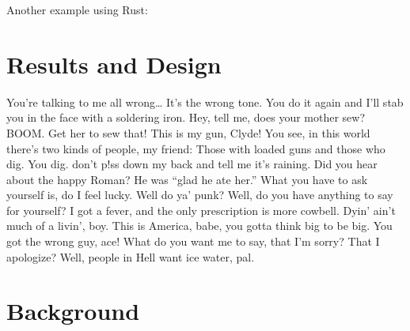Another example using Rust:

\begin{Shaded}
\begin{Highlighting}[]
 
 
 
 

   \NormalTok{) \{}
     
         
         
            \NormalTok{(}
            \NormalTok{;}
        \NormalTok{\} } \NormalTok{\{}
            \NormalTok{;}
        \NormalTok{\}}
    \NormalTok{\}}
\NormalTok{\}}
\end{Highlighting}
\end{Shaded}

\chapter{Results and Design}\label{results-and-design}

You're talking to me all wrong\ldots{} It's the wrong tone. You do it
again and I'll stab you in the face with a soldering iron. Hey, tell me,
does your mother sew? BOOM. Get her to sew that! This is my gun, Clyde!
You see, in this world there's two kinds of people, my friend: Those
with loaded guns and those who dig. You dig. don't p!ss down my back and
tell me it's raining. Did you hear about the happy Roman? He was ``glad
he ate her.'' What you have to ask yourself is, do I feel lucky. Well do
ya' punk? Well, do you have anything to say for yourself? I got a fever,
and the only prescription is more cowbell. Dyin' ain't much of a livin',
boy. This is America, babe, you gotta think big to be big. You got the
wrong guy, ace! What do you want me to say, that I'm sorry? That I
apologize? Well, people in Hell want ice water, pal.

\chapter{Background}\label{background}

